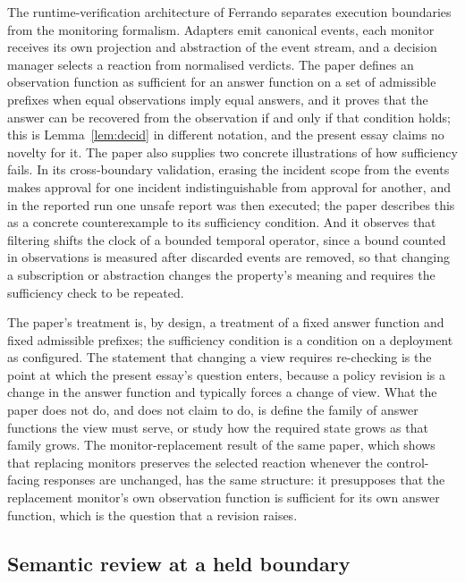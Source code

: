 \documentclass[11pt]{article}
\theoremstyle{definition}
\theoremstyle{remark}
\begin{document}
The runtime-verification architecture of Ferrando \cite{agenticrv} separates execution boundaries from the monitoring formalism. Adapters emit canonical events, each monitor receives its own projection and abstraction of the event stream, and a decision manager selects a reaction from normalised verdicts. The paper defines an observation function as sufficient for an answer function on a set of admissible prefixes when equal observations imply equal answers, and it proves that the answer can be recovered from the observation if and only if that condition holds; this is Lemma~\ref{lem:decid} in different notation, and the present essay claims no novelty for it. The paper also supplies two concrete illustrations of how sufficiency fails. In its cross-boundary validation, erasing the incident scope from the events makes approval for one incident indistinguishable from approval for another, and in the reported run one unsafe report was then executed; the paper describes this as a concrete counterexample to its sufficiency condition. And it observes that filtering shifts the clock of a bounded temporal operator, since a bound counted in observations is measured after discarded events are removed, so that changing a subscription or abstraction changes the property's meaning and requires the sufficiency check to be repeated.

The paper's treatment is, by design, a treatment of a fixed answer function and fixed admissible prefixes; the sufficiency condition is a condition on a deployment as configured. The statement that changing a view requires re-checking is the point at which the present essay's question enters, because a policy revision is a change in the answer function and typically forces a change of view. What the paper does not do, and does not claim to do, is define the family of answer functions the view must serve, or study how the required state grows as that family grows. The monitor-replacement result of the same paper, which shows that replacing monitors preserves the selected reaction whenever the control-facing responses are unchanged, has the same structure: it presupposes that the replacement monitor's own observation function is sufficient for its own answer function, which is the question that a revision raises.

\subsection{Semantic review at a held boundary}
\end{document}

